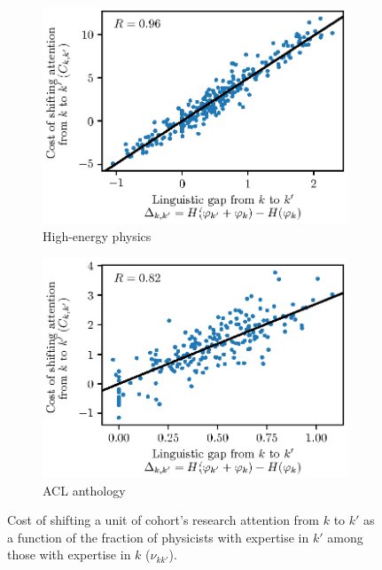 \documentclass{article}
\begin{document}
\begin{figure}[h]
\begin{subfigure}{.45\textwidth}
    \centering
    \includegraphics[width=1.15\textwidth]{plots/cost_vs_nu_linguistic.eps}
    \caption{\label{fig:knowledge_hep}High-energy physics}
\end{subfigure}\hfill%
\begin{subfigure}{0.45\textwidth}
    \centering
    \includegraphics[width=1.15\textwidth]{plots/cost_vs_nu_linguistic_acl.eps}
    \caption{\label{fig:knowledge_acl}ACL anthology}
\end{subfigure}
\caption{Cost of shifting a unit of cohort's research attention from $k$ to $k'$ as a function of the fraction of physicists with expertise in $k'$ among those with expertise in $k$ ($\nu_{kk'}$).}
\label{fig:knowledge}
\end{figure}
\end{document}
